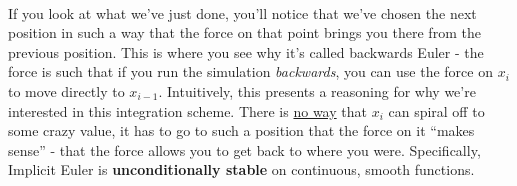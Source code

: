 \documentclass[]{article}
\begin{document}
\paragraph{}

If you look at what we've just done, you'll notice that we've chosen the next position in such a way that the force on that point brings you there from the previous position. This is where you see why it's called backwards Euler - the force is such that if you run the simulation \emph{backwards}, you can use the force on $x_i$ to move directly to $x_{i-1}$. Intuitively, this presents a reasoning for why we're interested in this integration scheme. There is \underline{no way} that $x_i$ can spiral off to some crazy value, it has to go to such a position that the force on it ``makes sense'' - that the force allows you to get back to where you were. Specifically, Implicit Euler is \textbf{unconditionally stable} on continuous, smooth functions.

\paragraph{}
\end{document}
